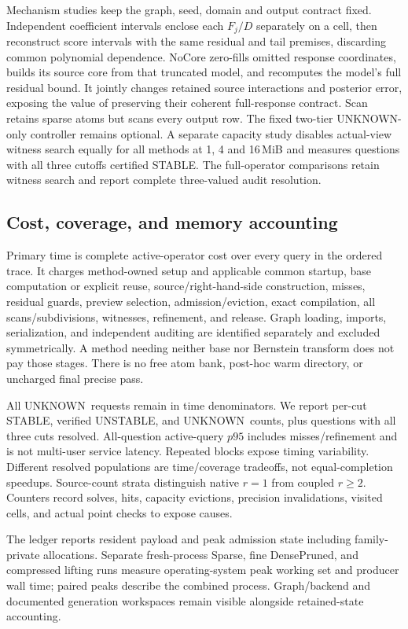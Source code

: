 \documentclass[conference]{IEEEtran}
\newcommand{\stable}{\textsf{STABLE}}
\newcommand{\unstable}{\textsf{UNSTABLE}}
\newcommand{\unknown}{\textsf{UNKNOWN}}
\begin{document}
Mechanism studies keep the graph, seed, domain and output contract fixed. Independent coefficient intervals enclose each $F_j/D$ separately on a cell, then reconstruct score intervals with the same residual and tail premises, discarding common polynomial dependence. NoCore zero-fills omitted response coordinates, builds its source core from that truncated model, and recomputes the model's full residual bound. It jointly changes retained source interactions and posterior error, exposing the value of preserving their coherent full-response contract. Scan retains sparse atoms but scans every output row. The fixed two-tier \unknown-only controller remains optional. A separate capacity study disables actual-view witness search equally for all methods at 1, 4 and 16\,MiB and measures questions with all three cutoffs certified \stable. The full-operator comparisons retain witness search and report complete three-valued audit resolution.

\subsection{Cost, coverage, and memory accounting}
Primary time is complete active-operator cost over every query in the ordered trace. It charges method-owned setup and applicable common startup, base computation or explicit reuse, source/right-hand-side construction, misses, residual guards, preview selection, admission/eviction, exact compilation, all scans/subdivisions, witnesses, refinement, and release. Graph loading, imports, serialization, and independent auditing are identified separately and excluded symmetrically. A method needing neither base nor Bernstein transform does not pay those stages. There is no free atom bank, post-hoc warm directory, or uncharged final precise pass.

All \unknown\ requests remain in time denominators. We report per-cut \stable, verified \unstable, and \unknown\ counts, plus questions with all three cuts resolved. All-question active-query $p95$ includes misses/refinement and is not multi-user service latency. Repeated blocks expose timing variability. Different resolved populations are time/coverage tradeoffs, not equal-completion speedups. Source-count strata distinguish native $r=1$ from coupled $r\geq2$. Counters record solves, hits, capacity evictions, precision invalidations, visited cells, and actual point checks to expose causes.

The ledger reports resident payload and peak admission state including family-private allocations. Separate fresh-process Sparse, fine DensePruned, and compressed lifting runs measure operating-system peak working set and producer wall time; paired peaks describe the combined process. Graph/backend and documented generation workspaces remain visible alongside retained-state accounting.
\end{document}
